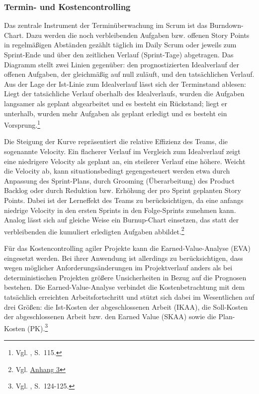 \documentclass[
    12pt, 
    a4paper,
    ]{scrartcl} %
\begin{document}
\subsubsection{Termin- und Kostencontrolling}
Das zentrale Instrument der Terminüberwachung im Scrum ist das Burndown-Chart. Dazu werden die noch verbleibenden Aufgaben bzw. offenen Story Points in regelmäßigen Abständen gezählt täglich im Daily Scrum oder jeweils zum Sprint-Ende und über den zeitlichen Verlauf (Sprint-Tage) abgetragen. Das Diagramm stellt zwei Linien gegenüber: den prognostizierten Idealverlauf der offenen Aufgaben, der gleichmäßig auf null zuläuft, und den tatsächlichen Verlauf. Aus der Lage der Ist-Linie zum Idealverlauf lässt sich der Terminstand ablesen: Liegt der tatsächliche Verlauf oberhalb des Idealverlaufs, wurden die Aufgaben langsamer als geplant abgearbeitet und es besteht ein Rückstand; liegt er unterhalb, wurden mehr Aufgaben als geplant erledigt und es besteht ein Vorsprung.\footnote{Vgl. \cite{Mayrhofer_HybridesProjektmanagement}, S.~115.}

Die Steigung der Kurve repräsentiert die relative Effizienz des Teams, die sogenannte Velocity. Ein flacherer Verlauf im Vergleich zum Idealverlauf zeigt eine niedrigere Velocity als geplant an, ein steilerer Verlauf eine höhere. Weicht die Velocity ab, kann situationsbedingt gegengesteuert werden etwa durch Anpassung des Sprint-Plans, durch Grooming (Überarbeitung) des Product Backlog oder durch Reduktion bzw. Erhöhung der pro Sprint geplanten Story Points. Dabei ist der Lerneffekt des Teams zu berücksichtigen, da eine anfangs niedrige Velocity in den ersten Sprints in den Folge-Sprints zunehmen kann. Analog lässt sich auf gleiche Weise ein Burnup-Chart einsetzen, das statt der verbleibenden die kumuliert erledigten Aufgaben abbildet.\footnote{Vgl. \hyperref[sec:Anhang3]{Anhang 3}}

Für das Kostencontrolling agiler Projekte kann die Earned-Value-Analyse (EVA) eingesetzt werden.
Bei ihrer Anwendung ist allerdings zu berücksichtigen, dass wegen möglicher Anforderungsänderungen im Projektverlauf anders als bei deterministischen Projekten größere Unsicherheiten in Bezug auf die Prognosen bestehen. Die Earned-Value-Analyse verbindet die Kostenbetrachtung mit dem tatsächlich erreichten Arbeitsfortschritt und stützt sich dabei im Wesentlichen auf drei Größen: die Ist-Kosten der abgeschlossenen Arbeit (IKAA), die Soll-Kosten der abgeschlossenen Arbeit bzw. den Earned Value (SKAA) sowie die Plan-Kosten (PK).\footnote{Vgl. \cite{Mayrhofer_HybridesProjektmanagement}, S.~124-125.}
\end{document}

